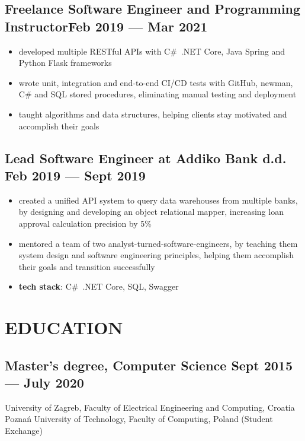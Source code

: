 \documentclass{article}
\begin{document}
\subsection{Freelance Software Engineer and Programming Instructor\hfill Feb 2019 --- Mar 2021}
\begin{itemize}
  \itemsep0em
  \item developed multiple RESTful APIs with C\#~.NET Core, Java Spring and Python Flask frameworks
  \item wrote unit, integration and end-to-end CI/CD tests with GitHub, newman, C\# and SQL stored procedures, eliminating manual testing and deployment
  \item taught algorithms and data structures, helping clients stay motivated and accomplish their goals
\end{itemize}

\subsection{Lead Software Engineer at Addiko Bank d.d. \hfill Feb 2019 --- Sept 2019}
\begin{itemize}
  \itemsep0em
  \item created a unified API system to query data warehouses from multiple banks, by designing and developing an object relational mapper, increasing loan approval calculation precision by 5\%
  \item mentored a team of two analyst-turned-software-engineers, by teaching them system design and software engineering principles, helping them accomplish their goals and transition successfully
  \item {\bfseries tech stack}: C\#~.NET Core, SQL, Swagger
\end{itemize}

\section{EDUCATION}
\subsection{Master's degree, Computer Science \hfill Sept 2015 --- July 2020}
University of Zagreb, Faculty of Electrical Engineering and Computing, Croatia\\
Poznań University of Technology, Faculty of Computing, Poland (Student Exchange)

\end{document}
